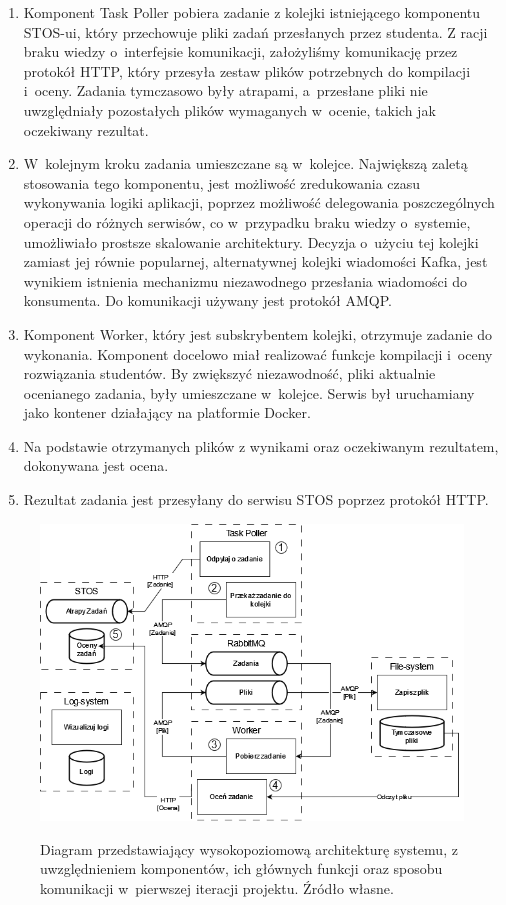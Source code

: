 \begin{enumerate}
	\item Komponent Task Poller pobiera zadanie z kolejki istniejącego komponentu STOS-ui, który przechowuje pliki zadań przesłanych przez studenta. Z racji braku wiedzy o~interfejsie komunikacji, założyliśmy komunikację przez protokół HTTP, który przesyła zestaw plików potrzebnych do kompilacji i~oceny. Zadania tymczasowo były atrapami, a~przesłane pliki nie uwzględniały pozostałych plików wymaganych w~ocenie, takich jak oczekiwany rezultat.
	\item W~kolejnym kroku zadania umieszczane są w~kolejce. Największą zaletą stosowania tego komponentu, jest możliwość zredukowania czasu wykonywania logiki aplikacji, poprzez możliwość delegowania poszczególnych operacji do różnych serwisów, co w~przypadku braku wiedzy o~systemie, umożliwiało prostsze skalowanie architektury. Decyzja o~użyciu tej kolejki zamiast jej równie popularnej, alternatywnej kolejki wiadomości Kafka, jest wynikiem istnienia mechanizmu niezawodnego przesłania wiadomości do konsumenta. Do komunikacji używany jest protokół AMQP.
	\item Komponent Worker, który jest subskrybentem kolejki, otrzymuje zadanie do wykonania. Komponent docelowo miał realizować funkcje kompilacji i~oceny rozwiązania studentów. By zwiększyć niezawodność, pliki aktualnie ocenianego zadania, były umieszczane w~kolejce. Serwis był uruchamiany jako kontener działający na platformie Docker.
	\item Na podstawie otrzymanych plików z wynikami oraz oczekiwanym rezultatem, dokonywana jest ocena.
	\item Rezultat zadania jest przesyłany do serwisu STOS poprzez protokół HTTP.
\end{enumerate}
\begin{figure}[!h]
	\begin{center}
		\resizebox{1.0\textwidth}{!} {
			\includegraphics{img/1/i1_arch.png}
		}
		\caption[Architektura po pierwszej iteracji]{Diagram przedstawiający wysokopoziomową architekturę systemu, z uwzględnieniem komponentów, ich głównych funkcji oraz sposobu komunikacji w~pierwszej iteracji projektu. Źródło własne.}
		\label{i1}
	\end{center}
\end{figure}

